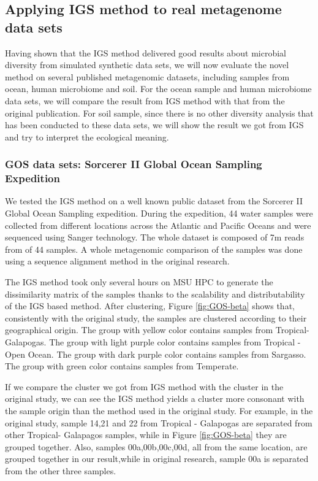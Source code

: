 \documentclass{article}
\begin{document}
\subsection{Applying IGS method to real metagenome data sets}

Having shown that the IGS method delivered good results about microbial diversity 
from simulated synthetic data sets, 
we will now evaluate the novel method on several published metagenomic 
datasets, including samples 
from ocean, human microbiome and soil. For the ocean sample and human microbiome 
data sets, we will compare the result from IGS method
with that from the original publication. For soil sample, since there is no other 
diversity analysis that has been conducted
to these data sets, we will show the result we got from IGS and try to 
interpret the ecological meaning.

\subsubsection{GOS data sets: Sorcerer II Global Ocean Sampling Expedition}

We tested the IGS method on a well known public dataset from the Sorcerer II 
Global Ocean Sampling expedition.
During the expedition, 44 water samples were collected from different locations across the
Atlantic and Pacific Oceans and were sequenced using Sanger technology. 
The whole dataset is composed of 7m reads from of 44 samples.
A whole metagenomic comparison of the samples was done
using a sequence alignment method in the original research. 

The IGS method took only several hours on MSU HPC to generate the dissimilarity 
matrix of the samples thanks to the scalability and distributability of the IGS 
based method. After clustering, 
Figure \ref{fig:GOS-beta} shows that, consistently with the original study, 
the samples are clustered according to their 
geographical origin. The group with yellow color contains samples from 
Tropical- Galapogas. The group with light purple color
contains samples from Tropical -Open Ocean. The group with dark purple 
color contains samples from Sargasso. The group 
with green color contains samples from Temperate. 

If we compare the cluster we got from IGS method with the cluster in the original 
study, we can see the IGS method yields a
cluster more consonant with the sample origin
than the method used in the original 
study. For example, in the original study,
sample 14,21 and 22 from Tropical - Galapogas are separated from other 
Tropical- Galapagos samples, while in Figure \ref{fig:GOS-beta} 
they are grouped together. Also, samples 00a,00b,00c,00d, all from the 
same location, are grouped together in our result,while
in original research, sample 00a is separated from the other three samples.
\end{document}
